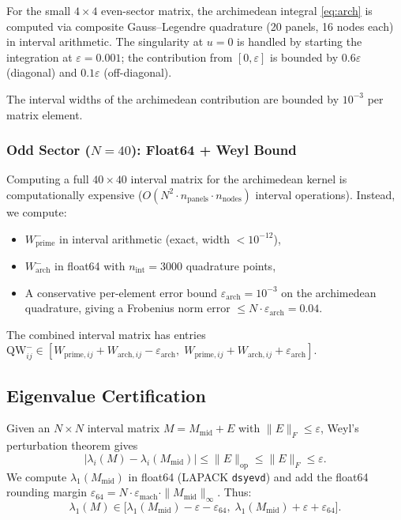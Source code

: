 \documentclass[12pt,a4paper]{article}
\theoremstyle{definition}
\theoremstyle{remark}
\begin{document}
For the small $4 \times 4$ even-sector matrix, the archimedean integral \eqref{eq:arch} is computed via composite Gauss--Legendre quadrature (20 panels, 16 nodes each) in interval arithmetic. The singularity at $u = 0$ is handled by starting the integration at $\varepsilon = 0.001$; the contribution from $[0, \varepsilon]$ is bounded by $0.6\varepsilon$ (diagonal) and $0.1\varepsilon$ (off-diagonal).

The interval widths of the archimedean contribution are bounded by $10^{-3}$ per matrix element.

\subsubsection{Odd Sector ($N=40$): Float64 + Weyl Bound}

Computing a full $40 \times 40$ interval matrix for the archimedean kernel is computationally expensive ($O(N^2 \cdot n_{\mathrm{panels}} \cdot n_{\mathrm{nodes}})$ interval operations). Instead, we compute:
\begin{itemize}
  \item $W_{\mathrm{prime}}^-$ in interval arithmetic (exact, width $< 10^{-12}$),
  \item $W_{\mathrm{arch}}^-$ in float64 with $n_{\mathrm{int}} = 3000$ quadrature points,
  \item A conservative per-element error bound $\varepsilon_{\mathrm{arch}} = 10^{-3}$ on the archimedean quadrature, giving a Frobenius norm error $\leq N \cdot \varepsilon_{\mathrm{arch}} = 0.04$.
\end{itemize}

The combined interval matrix has entries $\mathrm{QW}^-_{ij} \in [W_{\mathrm{prime},ij} + W_{\mathrm{arch},ij} - \varepsilon_{\mathrm{arch}},\; W_{\mathrm{prime},ij} + W_{\mathrm{arch},ij} + \varepsilon_{\mathrm{arch}}]$.

\subsection{Eigenvalue Certification}

Given an $N \times N$ interval matrix $M = M_{\mathrm{mid}} + E$ with $\|E\|_F \leq \varepsilon$, Weyl's perturbation theorem gives
\[
|\lambda_i(M) - \lambda_i(M_{\mathrm{mid}})| \leq \|E\|_{\mathrm{op}} \leq \|E\|_F \leq \varepsilon.
\]
We compute $\lambda_1(M_{\mathrm{mid}})$ in float64 (LAPACK \texttt{dsyevd}) and add the float64 rounding margin $\varepsilon_{64} = N \cdot \varepsilon_{\mathrm{mach}} \cdot \|M_{\mathrm{mid}}\|_\infty$. Thus:
\begin{equation}
\lambda_1(M) \in \bigl[\lambda_1(M_{\mathrm{mid}}) - \varepsilon - \varepsilon_{64},\; \lambda_1(M_{\mathrm{mid}}) + \varepsilon + \varepsilon_{64}\bigr].
\end{equation}
\end{document}
